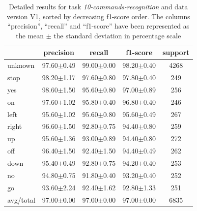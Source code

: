 \documentclass[review]{elsarticle}
\begin{document}
\begin{table}
\end{table}



\begin{table} \centering \scriptsize
	\caption{Detailed results for task \textit{10-commands-recognition} and data version V1, sorted by decreasing f1-score order. The columns ``precision'', ``recall'' and ``f1-score'' have been represented as the mean $\pm$ the standard deviation in percentage scale }
	\begin{tabular}{lcccc}
		\toprule
		{} &       precision &          recall &        f1-score & support \\
		\midrule
		unknown   &  97.60$\pm$0.49 &  99.00$\pm$0.00 &  98.20$\pm$0.40 &    4268 \\
		stop      &  98.20$\pm$1.17 &  97.60$\pm$0.80 &  97.80$\pm$0.40 &     249 \\
		yes       &  98.60$\pm$1.50 &  95.60$\pm$0.80 &  97.00$\pm$0.89 &     256 \\
		on        &  97.60$\pm$1.02 &  95.80$\pm$0.40 &  96.80$\pm$0.40 &     246 \\
		left      &  95.60$\pm$1.02 &  95.60$\pm$0.80 &  95.60$\pm$0.49 &     267 \\
		right     &  96.60$\pm$1.50 &  92.80$\pm$0.75 &  94.40$\pm$0.80 &     259 \\
		up        &  95.60$\pm$1.36 &  93.00$\pm$0.89 &  94.40$\pm$0.80 &     272 \\
		off       &  96.40$\pm$1.50 &  92.40$\pm$1.50 &  94.40$\pm$0.49 &     262 \\
		down      &  95.40$\pm$0.49 &  92.80$\pm$0.75 &  94.20$\pm$0.40 &     253 \\
		no        &  94.80$\pm$0.75 &  91.80$\pm$0.40 &  93.20$\pm$0.40 &     252 \\
		go        &  93.60$\pm$2.24 &  92.40$\pm$1.62 &  92.80$\pm$1.33 &     251 \\
		\midrule avg/total &  97.00$\pm$0.00 &  97.00$\pm$0.00 &  97.00$\pm$0.00 &    6835 \\
		\bottomrule
	\end{tabular}
	
\end{table}
\end{document}
